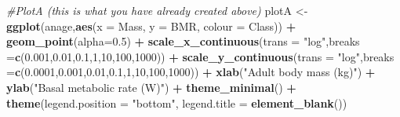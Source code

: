 \documentclass[
  a4paperpaper,
]{book}
\newenvironment{Shaded}{\begin{snugshade}}{\end{snugshade}}
\newcommand{\CommentTok}[1]{\textcolor[rgb]{0.56,0.35,0.01}{\textit{#1}}}
\newcommand{\DataTypeTok}[1]{\textcolor[rgb]{0.13,0.29,0.53}{#1}}
\newcommand{\DecValTok}[1]{\textcolor[rgb]{0.00,0.00,0.81}{#1}}
\newcommand{\FloatTok}[1]{\textcolor[rgb]{0.00,0.00,0.81}{#1}}
\newcommand{\KeywordTok}[1]{\textcolor[rgb]{0.13,0.29,0.53}{\textbf{#1}}}
\newcommand{\NormalTok}[1]{#1}
\newcommand{\OperatorTok}[1]{\textcolor[rgb]{0.81,0.36,0.00}{\textbf{#1}}}
\newcommand{\StringTok}[1]{\textcolor[rgb]{0.31,0.60,0.02}{#1}}
\begin{document}
\begin{Shaded}
\begin{Highlighting}[]
\CommentTok{\#PlotA (this is what you have already created above)}
\NormalTok{plotA \textless{}{-}}\StringTok{ }\KeywordTok{ggplot}\NormalTok{(anage,}\KeywordTok{aes}\NormalTok{(}\DataTypeTok{x =}\NormalTok{ Mass, }\DataTypeTok{y =}\NormalTok{ BMR, }\DataTypeTok{colour =}\NormalTok{ Class)) }\OperatorTok{+}
\StringTok{  }\KeywordTok{geom\_point}\NormalTok{(}\DataTypeTok{alpha=}\FloatTok{0.5}\NormalTok{) }\OperatorTok{+}\StringTok{ }
\StringTok{  }\KeywordTok{scale\_x\_continuous}\NormalTok{(}\DataTypeTok{trans =} \StringTok{"log"}\NormalTok{,}\DataTypeTok{breaks =}\KeywordTok{c}\NormalTok{(}\FloatTok{0.001}\NormalTok{,}\FloatTok{0.01}\NormalTok{,}\FloatTok{0.1}\NormalTok{,}\DecValTok{1}\NormalTok{,}\DecValTok{10}\NormalTok{,}\DecValTok{100}\NormalTok{,}\DecValTok{1000}\NormalTok{)) }\OperatorTok{+}\StringTok{ }
\StringTok{  }\KeywordTok{scale\_y\_continuous}\NormalTok{(}\DataTypeTok{trans =} \StringTok{"log"}\NormalTok{,}\DataTypeTok{breaks =}\KeywordTok{c}\NormalTok{(}\FloatTok{0.0001}\NormalTok{,}\FloatTok{0.001}\NormalTok{,}\FloatTok{0.01}\NormalTok{,}\FloatTok{0.1}\NormalTok{,}\DecValTok{1}\NormalTok{,}\DecValTok{10}\NormalTok{,}\DecValTok{100}\NormalTok{,}\DecValTok{1000}\NormalTok{)) }\OperatorTok{+}
\StringTok{  }\KeywordTok{xlab}\NormalTok{(}\StringTok{"Adult body mass (kg)"}\NormalTok{) }\OperatorTok{+}\StringTok{ }
\StringTok{  }\KeywordTok{ylab}\NormalTok{(}\StringTok{"Basal metabolic rate (W)"}\NormalTok{) }\OperatorTok{+}
\StringTok{  }\KeywordTok{theme\_minimal}\NormalTok{() }\OperatorTok{+}
\StringTok{  }\KeywordTok{theme}\NormalTok{(}\DataTypeTok{legend.position  =} \StringTok{"bottom"}\NormalTok{,}
        \DataTypeTok{legend.title =} \KeywordTok{element\_blank}\NormalTok{())}


\end{Highlighting}
\end{Shaded}
\end{document}
